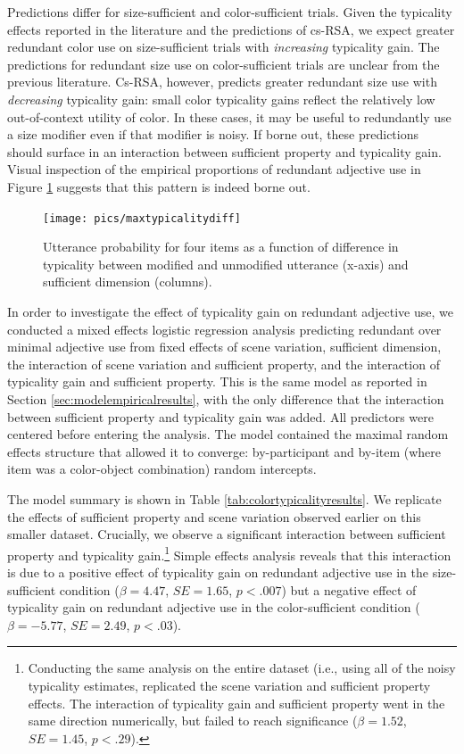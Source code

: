 \documentclass[11pt]{article}
\newcommand{\tableref}[1]{Table \ref{#1}}
\newcommand{\figref}[1]{Figure \ref{#1}}
\newcommand{\sectionref}[1]{Section \ref{#1}}
\begin{document}
Predictions differ for size-sufficient and color-sufficient trials. Given the typicality effects reported in the literature and the predictions of cs-RSA, we expect greater redundant color use on size-sufficient trials with \emph{increasing} typicality gain. The predictions for redundant size use on color-sufficient trials are unclear from the previous literature. Cs-RSA, however,  predicts greater redundant size use with \emph{decreasing} typicality gain: small color typicality gains reflect the relatively low out-of-context utility of color. In these cases, it may be useful to redundantly use a size modifier even if that modifier is noisy. If borne out, these predictions should surface in an interaction between sufficient property and typicality gain. Visual inspection of the empirical proportions of redundant adjective use in \figref{fig:maxtypicalitydiff} suggests that this pattern is indeed borne out.

\begin{figure}
\centering
\texttt{[image: pics/maxtypicalitydiff]}
\caption{Utterance probability for four items as a function of difference in typicality between modified and unmodified utterance (x-axis) and sufficient dimension (columns). }
\label{fig:maxtypicalitydiff}
\end{figure}

In order to investigate the effect of typicality gain on redundant adjective use, we conducted a mixed effects logistic regression analysis predicting redundant over minimal adjective use from fixed effects of scene variation, sufficient dimension, the interaction of scene variation and sufficient property, and the interaction of typicality gain and sufficient property. This is the same model as reported in \sectionref{sec:modelempiricalresults}, with the only difference that the interaction between sufficient property and typicality gain was added. All predictors were centered before entering the analysis. The model contained the maximal random effects structure that allowed it to converge: by-participant and by-item (where item was a color-object combination) random intercepts. 

The model summary is shown in \tableref{tab:colortypicalityresults}. We replicate the effects of sufficient property and scene variation observed earlier on this smaller dataset. Crucially, we observe a significant interaction between sufficient property and typicality gain.\footnote{Conducting the same analysis on the entire dataset (i.e., using all of the noisy typicality estimates, replicated the scene variation and sufficient property effects. The interaction of typicality gain and sufficient property went in the same direction numerically, but failed to reach significance ($\beta = 1.52$, $SE = 1.45$, $p < .29$).} Simple effects analysis reveals that this interaction is due to a positive effect of typicality gain on redundant adjective use in the size-sufficient condition ($\beta = 4.47$, $SE = 1.65$, $p < .007$) but a negative effect of typicality gain on redundant adjective use in the color-sufficient condition  ($\beta = -5.77$, $SE = 2.49$, $p < .03$). 
\end{document}
